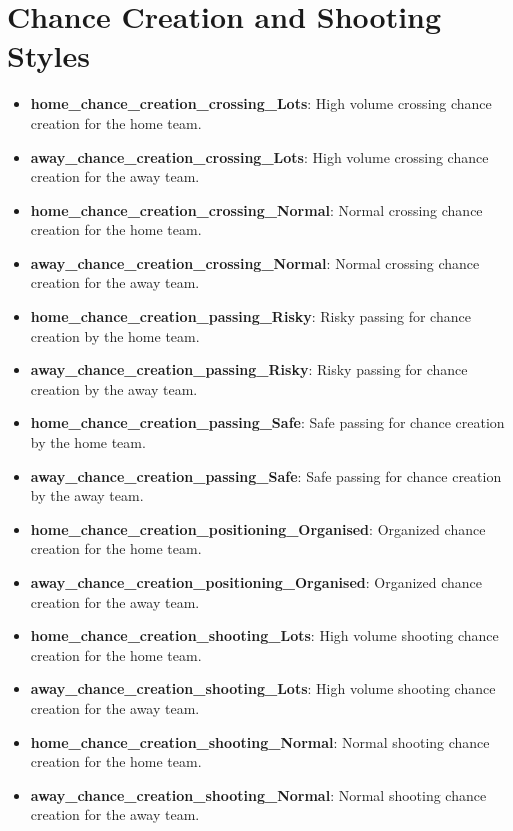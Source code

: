\section{Chance Creation and Shooting Styles}
\begin{itemize}
    \item \textbf{home\_chance\_creation\_crossing\_Lots}: High volume crossing chance creation for the home team.
    \item \textbf{away\_chance\_creation\_crossing\_Lots}: High volume crossing chance creation for the away team.
    \item \textbf{home\_chance\_creation\_crossing\_Normal}: Normal crossing chance creation for the home team.
    \item \textbf{away\_chance\_creation\_crossing\_Normal}: Normal crossing chance creation for the away team.
    \item \textbf{home\_chance\_creation\_passing\_Risky}: Risky passing for chance creation by the home team.
    \item \textbf{away\_chance\_creation\_passing\_Risky}: Risky passing for chance creation by the away team.
    \item \textbf{home\_chance\_creation\_passing\_Safe}: Safe passing for chance creation by the home team.
    \item \textbf{away\_chance\_creation\_passing\_Safe}: Safe passing for chance creation by the away team.
    \item \textbf{home\_chance\_creation\_positioning\_Organised}: Organized chance creation for the home team.
    \item \textbf{away\_chance\_creation\_positioning\_Organised}: Organized chance creation for the away team.
    \item \textbf{home\_chance\_creation\_shooting\_Lots}: High volume shooting chance creation for the home team.
    \item \textbf{away\_chance\_creation\_shooting\_Lots}: High volume shooting chance creation for the away team.
    \item \textbf{home\_chance\_creation\_shooting\_Normal}: Normal shooting chance creation for the home team.
    \item \textbf{away\_chance\_creation\_shooting\_Normal}: Normal shooting chance creation for the away team.
\end{itemize}

